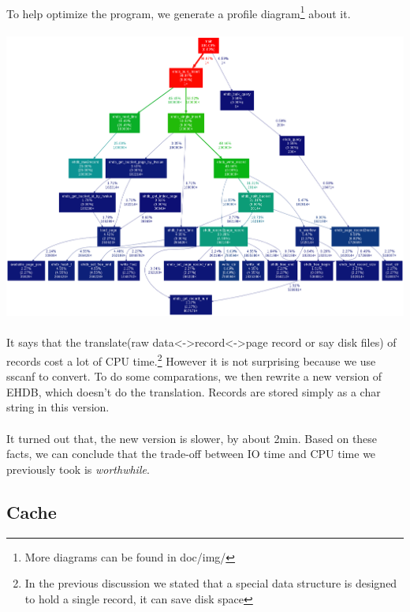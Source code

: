 \documentclass{article}
\begin{document}
        \paragraph{}
            To help optimize the program, we generate a profile diagram\footnote{More diagrams can be found in doc/img/} about it.
        \paragraph{} \includegraphics[scale=0.3]{img/proff_big_record.png}
        \paragraph{}
            It says that the translate(raw data<->record<->page record or say disk files) of records cost a lot of CPU time.\footnote{In the previous discussion we stated that a special data structure is designed to hold a single record, it can save disk space} However it is not surprising because we use sscanf to convert. To do some comparations, we then rewrite a new version of EHDB, which doesn't do the translation. Records are stored simply as a char string in this version.
        \paragraph{}
            It turned out that, the new version is slower, by about 2min. Based on these facts, we can conclude that the trade-off between IO time and CPU time we previously took is \emph{worthwhile}.
    \subsection{Cache}
\end{document}
